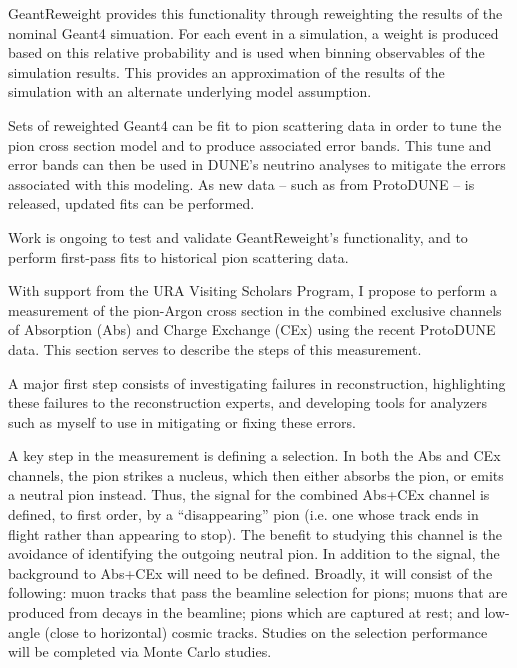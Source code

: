 \documentclass[12pt]{article}
\begin{document}
	GeantReweight provides this functionality through reweighting the results of the nominal Geant4 simuation. For each event in a simulation, a weight is produced based on this relative probability and is used when binning observables of the simulation results. This provides an approximation of the results of the simulation with an alternate underlying model assumption. 	 
	
	Sets of reweighted Geant4 can be fit to pion scattering data in order to tune the pion cross section model and to produce associated error bands. This tune and error bands can then be used in DUNE’s neutrino analyses to mitigate the errors associated with this modeling. As new data – such as from ProtoDUNE – is released, updated fits can be performed.
	
	Work is ongoing to test and validate GeantReweight’s functionality, and to perform first-pass fits to historical pion scattering data. 
\\


	With support from the URA Visiting Scholars Program, I propose to perform a measurement of the pion-Argon cross section in the combined exclusive channels of Absorption (Abs) and Charge Exchange (CEx) using the recent ProtoDUNE data. This section serves to describe the steps of this measurement.
	
	A major first step consists of investigating failures in reconstruction, highlighting these failures to the reconstruction experts, and developing tools for analyzers such as myself to use in mitigating or fixing these errors.
	
	A key step in the measurement is defining a selection. In both the Abs and CEx channels, the pion strikes a nucleus, which then either absorbs the pion, or emits a neutral pion instead. Thus, the signal for the combined Abs+CEx channel is defined, to first order, by a “disappearing” pion (i.e. one whose track ends in flight rather than appearing to stop). The benefit to studying this channel is the avoidance of identifying the outgoing neutral pion. In addition to the signal, the background to Abs+CEx will need to be defined. Broadly, it will consist of the following: muon tracks that pass the beamline selection for pions; muons that are produced from decays in the beamline; pions which are captured at rest; and low-angle (close to horizontal) cosmic tracks. Studies on the selection performance will be completed via Monte Carlo studies.
	
\end{document}
